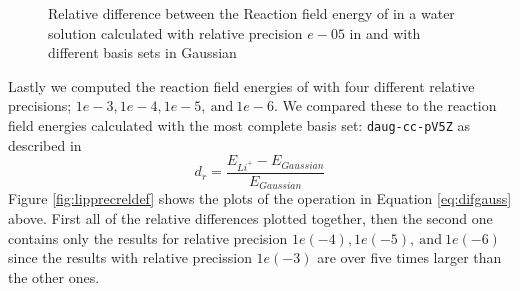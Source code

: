 \documentclass[../master_thesis.tex]{subfiles}
\begin{document}
\begin{figure}[h!]
\begin{subfigure}[b]{0.75\linewidth}
  \end{subfigure}
  \caption{Relative difference between the Reaction field energy of  in a water solution calculated with relative precision $e-05$ in \mrchem
  and with different basis sets in Gaussian}
  \label{fig:lipreldiff02}
\end{figure}

Lastly we computed the reaction field energies of  with four different
relative precisions; $1e-3, 1e-4, 1e-5,\  \text{and}\  1e-6$. We compared these
to the reaction field energies calculated with the most complete basis set:
\verb!daug-cc-pV5Z! as described in
\begin{equation}\label{eq:difgauss}
    d_r = \frac{E_{Li^+} - E_{Gaussian}}{E_{Gaussian}}
\end{equation}
Figure \ref{fig:lipprecreldef} shows the plots of the operation in Equation \ref{eq:difgauss} above.
First all of the relative differences plotted together, then the second one contains
only the results for relative precision $1e(-4), 1e(-5),\  \text{and}\  1e(-6)$ since
the results with relative precission $1e(-3)$ are over five times larger than the other ones.
\end{document}
